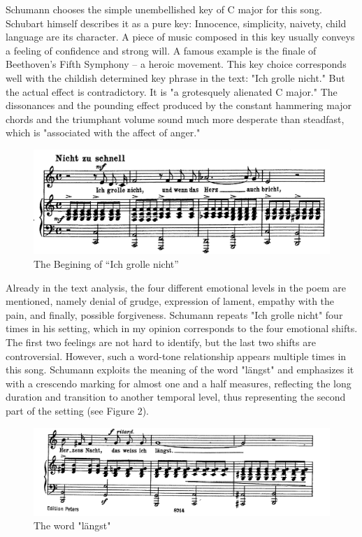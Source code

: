 \documentclass[10pt,a4paper,twocolumn]{rho}
\begin{document}
Schumann chooses the simple unembellished key of C major for this song. Schubart himself describes it as a pure key: Innocence, simplicity, naivety, child language are its character. A piece of music composed in this key usually conveys a feeling of confidence and strong will. A famous example is the finale of Beethoven's Fifth Symphony – a heroic movement. This key choice corresponds well with the childish determined key phrase in the text: "Ich grolle nicht." But the actual effect is contradictory. It is "a grotesquely alienated C major." The dissonances and the pounding effect produced by the constant hammering major chords and the triumphant volume sound much more desperate than steadfast, which is "associated with the affect of anger."
\begin{figure}[H]
    \centering
    \includegraphics[width=0.7\linewidth]{Ich grolle nicht.png}
    \caption{The Begining of “Ich grolle nicht”}
    \label{“Ich grolle nicht”}
\end{figure}
Already in the text analysis, the four different emotional levels in the poem are mentioned, namely denial of grudge, expression of lament, empathy with the pain, and finally, possible forgiveness. Schumann repeats "Ich grolle nicht" four times in his setting, which in my opinion corresponds to the four emotional shifts. The first two feelings are not hard to identify, but the last two shifts are controversial. However, such a word-tone relationship appears multiple times in this song. Schumann exploits the meaning of the word "längst" and emphasizes it with a crescendo marking for almost one and a half measures, reflecting the long duration and transition to another temporal level, thus representing the second part of the setting (see Figure 2).
\begin{figure}[H]
    \centering
    \includegraphics[width=0.7\linewidth]{langst.png}
    \caption{The word "längst"}
    \label{fig:enter-label}
\end{figure}
\end{document}
